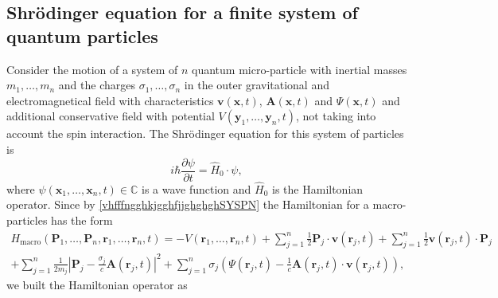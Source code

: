 \documentclass{article}
\theoremstyle{definition}
\theoremstyle{remark}
\renewcommand{\vec}[1]{\mathbf{#1}}
\newcommand{\er}{\eqref}
\newcommand{\er}{\eqref}
\begin{document}
\subsection{Shr\"{o}dinger equation for a finite system of quantum
particles}\label{hggyugyuy1} Consider the motion of a system of $n$
quantum micro-particle with inertial masses $m_1,\ldots,m_n$ and the
charges $\sigma_1,\ldots,\sigma_n$ in the outer gravitational and
electromagnetical field with characteristics $\vec v(\vec x,t)$,
$\vec A(\vec x,t)$ and $\Psi(\vec x,t)$ and additional conservative
field with potential $V(\vec y_1,\ldots,\vec y_n,t)$, not taking
into account the spin interaction. The Shr\"{o}dinger equation for
this system of particles is
\begin{equation}\label{vhfffngghkjgghfjjghghghhjghjgghkghggkghghjghSYSPN}
i\hbar\frac{\partial\psi}{\partial t}=\hat H_0\cdot\psi,
\end{equation}
where $\psi(\vec x_1,\ldots,\vec x_n,t)\in\mathbb{C}$ is a wave
function and $\hat H_0$ is the Hamiltonian operator. Since by
\er{vhfffngghkjgghfjjghghghSYSPN} the Hamiltonian for a
macro-particles has the form
\begin{multline}\label{vhfffngghkjgghfjjghghghhjghjgghkghggSYSPN}
H_{\text{macro}}\left(\vec P_1,\ldots,\vec P_n,\vec r_1,\ldots,\vec
r_n,t\right)=-V\left(\vec r_1,\ldots,\vec r_n,t\right)+
\sum_{j=1}^{n}\frac{1}{2}\vec P_j\cdot\vec v(\vec
r_j,t)+\sum_{j=1}^{n}\frac{1}{2}\vec v(\vec r_j,t)\cdot\vec P_j\\+
\sum_{j=1}^{n}\frac{1}{2m_j}\left|\vec P_j-\frac{\sigma_j}{c}\vec
A(\vec r_j,t)\right|^2+\sum_{j=1}^{n}\sigma_j\left(\Psi(\vec
r_j,t)-\frac{1}{c}\vec A(\vec r_j,t)\cdot\vec v(\vec r_j,t)\right),
\end{multline}
we built the Hamiltonian operator as
\end{document}
